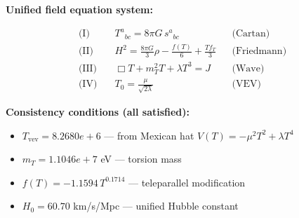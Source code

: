
\textbf{Unified field equation system:}

\begin{align}
  \text{(I)} \quad & T^a{}_{bc} = 8\pi G \, s^a{}_{bc} && \text{(Cartan)} \\
  \text{(II)} \quad & H^2 = \frac{8\pi G}{3}\rho - \frac{f(T)}{6} + \frac{Tf_T}{3} && \text{(Friedmann)} \\
  \text{(III)} \quad & \Box T + m_T^2 T + \lambda T^3 = J && \text{(Wave)} \\
  \text{(IV)} \quad & T_0 = \frac{\mu}{\sqrt{2\lambda}} && \text{(VEV)}
\end{align}

\textbf{Consistency conditions (all satisfied):}
\begin{itemize}
  \item $T_{\text{vev}} = 8.2680e+6$ — from Mexican hat $V(T) = -\mu^2 T^2 + \lambda T^4$
  \item $m_T = 1.1046e+7$ eV — torsion mass
  \item $f(T) = -1.1594 \, T^{0.1714}$ — teleparallel modification
  \item $H_0 = 60.70$ km/s/Mpc — unified Hubble constant
\end{itemize}